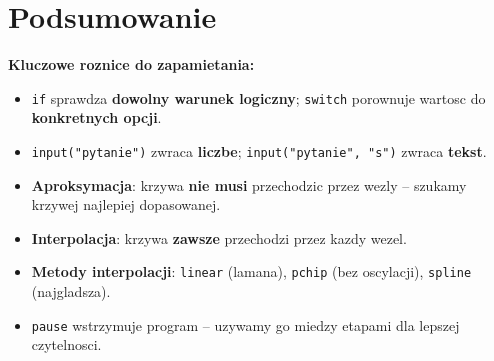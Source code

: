 \documentclass[12pt,a4paper]{article}
\begin{document}
	\newpage
	\section*{\textcolor{headerblue}{Podsumowanie}}
	
	\bigskip
	\begin{infobox}
		\textbf{Kluczowe roznice do zapamietania:}
		\begin{itemize}
			\item \texttt{if} sprawdza \textbf{dowolny warunek logiczny}; \texttt{switch} porownuje wartosc do \textbf{konkretnych opcji}.
			\item \texttt{input("pytanie")} zwraca \textbf{liczbe}; \texttt{input("pytanie", "s")} zwraca \textbf{tekst}.
			\item \textbf{Aproksymacja}: krzywa \textbf{nie musi} przechodzic przez wezly – szukamy krzywej najlepiej dopasowanej.
			\item \textbf{Interpolacja}: krzywa \textbf{zawsze} przechodzi przez kazdy wezel.
			\item \textbf{Metody interpolacji}: \texttt{linear} (lamana), \texttt{pchip} (bez oscylacji), \texttt{spline} (najgladsza).
			\item \texttt{pause} wstrzymuje program – uzywamy go miedzy etapami dla lepszej czytelnosci.
		\end{itemize}
	\end{infobox}
	
\end{document}
